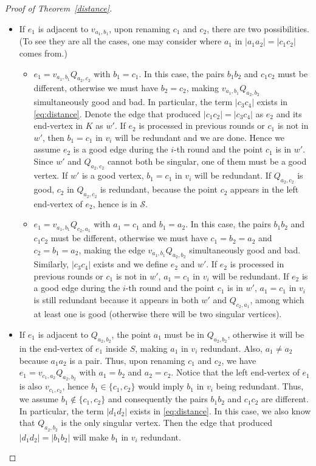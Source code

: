\documentclass[11pt]{article}
\theoremstyle{definition}
\begin{document}
\begin{proof}[Proof of Theorem~\ref{distance}]
\begin{itemize}
    \item If $e_1$ is adjacent to $v_{a_1,b_1}$, upon renaming $c_1$ and $c_2$, there are two possibilities. (To see they are all the cases, one may consider where $a_1$ in $|a_1a_2| = |c_1c_2|$ comes from.)
    \begin{itemize}
        \item $e_1 = v_{a_1,b_1} Q_{a_2,c_2}$ with $b_1=c_1$. In this case, the pairs $b_1b_2$ and $c_1c_2$ must be different, otherwise we must have $b_2 = c_2$, making $v_{a_1,b_1}Q_{a_2,b_2}$ simultaneously good and bad. In particular, the term $|c_3c_4|$ exists in \eqref{eq:distance}. Denote the edge that produced $|c_1c_2|=|c_3c_4|$ as $e_2$ and its end-vertex in $K$ as $w'$. If $e_2$ is processed in previous rounds or $c_1$ is not in $w'$, then $b_1=c_1$ in $v_i$ will be redundant and we are done. Hence we assume $e_2$ is a good edge during the $i$-th round and the point $c_1$ is in $w'$. Since $w'$ and $Q_{a_2,c_2}$ cannot both be singular, one of them must be a good vertex. If $w'$ is a good vertex, $b_1 = c_1$ in $v_i$ will be redundant. If $Q_{a_2,c_2}$ is good, $c_2$ in $Q_{a_2,c_2}$ is redundant, because the point $c_2$ appears in the left end-vertex of $e_2$, hence is in $\mathcal{S}$.
        
        \item $e_1 = v_{a_1,b_1} Q_{c_2,a_1}$ with $a_1=c_1$ and $b_1=a_2$. In this case, the pairs $b_1b_2$ and $c_1c_2$ must be different, otherwise we must have $c_1=b_2=a_2$ and $c_2=b_1=a_2$, making the edge $v_{a_1,b_1}Q_{a_2,b_2}$ simultaneously good and bad. Similarly, $|c_3c_4|$ exists and we define $e_2$ and $w'$. If $e_2$ is processed in previous rounds or $c_1$ is not in $w'$, $a_1 = c_1$ in $v_i$ will be redundant. If $e_2$ is a good edge during the $i$-th round and the point $c_1$ is in $w'$, $a_1 = c_1$ in $v_i$ is still redundant because it appears in both $w'$ and $Q_{c_2,a_1}$, among which at least one is good (otherwise there will be two singular vertices).
    \end{itemize}

    \item If $e_1$ is adjacent to $Q_{a_2,b_2}$, the point $a_1$ must be in $Q_{a_2,b_2}$, otherwise it will be in the end-vertex of $e_1$ inside $S$, making $a_1$ in $v_i$ redundant. Also, $a_1 \neq a_2$ because $a_1a_2$ is a pair. Thus, upon renaming $c_1$ and $c_2$, we have $e_1 = v_{c_1,a_2}Q_{a_2,b_2}$ with $a_1 = b_2$ and $a_2=c_2$. Notice that the left end-vertex of $e_1$ is also $v_{c_1,c_2}$, hence $b_1 \in \{c_1,c_2\}$ would imply $b_1$ in $v_i$ being redundant. Thus, we assume $b_1 \not\in \{c_1,c_2\}$ and consequently the pairs $b_1b_2$ and $c_1c_2$ are different. In particular, the term $|d_1d_2|$ exists in \eqref{eq:distance}. In this case, we also know that $Q_{a_2,b_2}$ is the only singular vertex. Then the edge that produced $|d_1d_2| = |b_1b_2|$ will make $b_1$ in $v_i$ redundant.
\end{itemize}


\end{proof}
\end{document}
